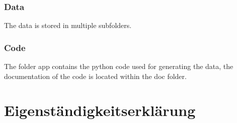 \documentclass[12pt,a4paper, english]{article}
\begin{document}
\subsubsection{Data}
The data is stored in multiple subfolders. 
\subsubsection{Code}
The folder app contains the python code used for generating the data, the documentation of the code is located within the doc folder.
%
%
\newpage
\printbibliography%
\newpage
\section*{Eigenständigkeitserklärung}

\end{document}
